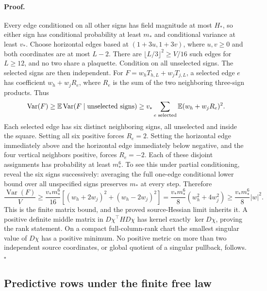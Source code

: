 \paragraph{Proof.}
Every edge conditioned on all other signs has field magnitude at most
\(H_*\), so either sign has conditional probability at least \(m_*\)
and conditional variance at least \(v_*\). Choose horizontal edges based
at \((1+3u,1+3v)\), where \(u,v\ge0\) and both coordinates are at most
\(L-2\). There are \(\lfloor L/3\rfloor^2\ge V/16\) such edges for
\(L\ge12\), and no two share a plaquette. Condition on all unselected
signs. The selected signs are then independent. For
\(F=w_hT_{h,L}+w_jT_{j,L}\), a selected edge \(e\) has coefficient
\(w_h+w_jR_e\), where \(R_e\) is the sum of the two neighboring
three-sign products. Thus
\begin{equation}
 \operatorname{Var}(F)\ge
 \mathbb E\operatorname{Var}(F\mid\text{unselected signs})
 \ge v_*\sum_{e\text{ selected}}\mathbb E(w_h+w_jR_e)^2.
 \label{eq:rg-thermo-native-separated-variance}
\end{equation}
Each selected edge has six distinct neighboring signs, all unselected and
inside the square. Setting all six positive forces \(R_e=2\). Setting
the horizontal edge immediately above and the horizontal edge immediately
below negative, and the four vertical neighbors positive, forces
\(R_e=-2\). Each of these disjoint assignments has probability at least
\(m_*^6\). To see this under partial conditioning, reveal the six signs
successively: averaging the full one-edge conditional lower bound over
all unspecified signs preserves \(m_*\) at every step. Therefore
\begin{equation}
 \frac{\operatorname{Var}(F)}V
 \ge\frac{v_*m_*^6}{16}
            [(w_h+2w_j)^2+(w_h-2w_j)^2]
 =\frac{v_*m_*^6}{8}(w_h^2+4w_j^2)
 \ge\frac{v_*m_*^6}{8}|w|^2.
 \label{eq:rg-thermo-native-directional-floor}
\end{equation}
This is the finite matrix bound, and the proved source-Hessian limit
inherits it. A positive definite middle matrix in \(D\chi^\top H D\chi\)
has kernel exactly \(\ker D\chi\), proving the rank statement. On a
compact full-column-rank chart the smallest singular value of \(D\chi\)
has a positive minimum. No positive metric on more than two independent
source coordinates, or global quotient of a singular pullback, follows.
\hfill\(\square\)

\subsection{Predictive rows under the finite free law}
\label{sec:rg-thermo-native-predictive-rows}

